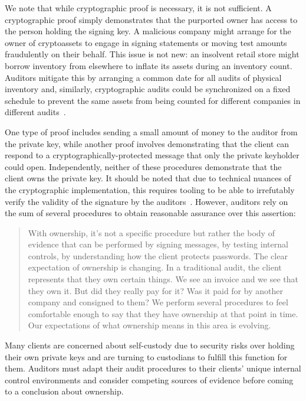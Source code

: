 We note that while cryptographic proof is necessary, it is not sufficient. A cryptographic proof simply demonstrates that the purported owner has access to the person holding the signing key. A malicious company might arrange for the owner of cryptoassets to engage in signing statements or moving test amounts fraudulently on their behalf. This issue is not new: an insolvent retail store might borrow inventory from elsewhere to inflate its assets during an inventory count. Auditors mitigate this by arranging a common date for all audits of physical inventory and, similarly, cryptographic audits could be synchronized on a fixed schedule to prevent the same assets from being counted for different companies in different audits~\cite{dagher2015provisions}. 

One type of proof includes sending a small amount of money to the auditor from the private key, while another proof involves demonstrating that the client can respond to a cryptographically-protected message that only the private keyholder could open. Independently, neither of these procedures demonstrate that the client owns the private key. It should be noted that due to technical nuances of the cryptographic implementation, this requires tooling to be able to irrefutably verify the validity of the signature by the auditors~\cite{gavinwrightcourt}. However, auditors rely on the sum of several procedures to obtain reasonable assurance over this assertion: 

\begin{quote}
With ownership, it's not a specific procedure but rather the body of evidence that can be performed by signing messages, by testing internal controls, by understanding how the client protects passwords. The clear expectation of ownership is changing. In a traditional audit, the client represents that they own certain things. We see an invoice and we see that they own it. But did they really pay for it? Was it paid for by another company and consigned to them? We perform several procedures to feel comfortable enough to say that they have ownership at that point in time. Our expectations of what ownership means in this area is evolving.
\end{quote}

Many clients are concerned about self-custody due to security risks over holding their own private keys and are turning to custodians to fulfill this function for them. Auditors must adapt their audit procedures to their clients' unique internal control environments and consider competing sources of evidence before coming to a conclusion about ownership. 

